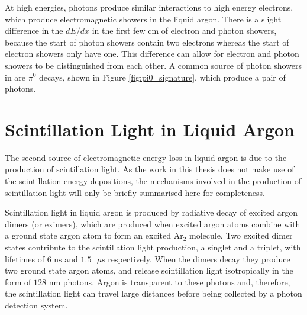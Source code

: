 At high energies, photons produce similar interactions to high energy electrons,
which produce electromagnetic showers in the liquid argon. There is a slight
difference in the $dE/dx$ in the first few cm of electron and photon showers, 
because the start of photon showers contain two electrons whereas the start of
electron showers only have one. This difference can allow for electron and 
photon showers to be distinguished from each other\cite{Acciarri:2016sli}. A 
common source of photon showers in \protodune{} are $\pi^0$ decays, shown in 
Figure \ref{fig:pi0_signature}, which produce a pair of photons.

\section{Scintillation Light in Liquid Argon}
The second source of electromagnetic energy loss in liquid argon is due to the
production of scintillation light. As the work in this thesis does not make
use of the scintillation energy depositions, the mechanisms involved in the 
production of scintillation light will only be briefly summarised here for 
completeness.

Scintillation light in liquid argon is produced by radiative decay of excited
argon dimers (or eximers), which are produced when excited argon atoms combine
with a ground state argon atom to form an excited $\mbox{Ar}_2$ molecule. Two 
excited dimer states contribute to the scintillation light production, a 
singlet and a triplet, with lifetimes of $6 \mbox{ ns}$ and $1.5 \mbox{ } \mu 
\mbox{s}$ respectively\cite{Lippincott:2008ad}. When the dimers decay they 
produce two ground state argon atoms, and release scintillation light 
isotropically in the form of $128 \mbox{ nm}$ photons. Argon is transparent to 
these photons and, therefore, the scintillation light can travel large 
distances before being collected by a photon detection system.
